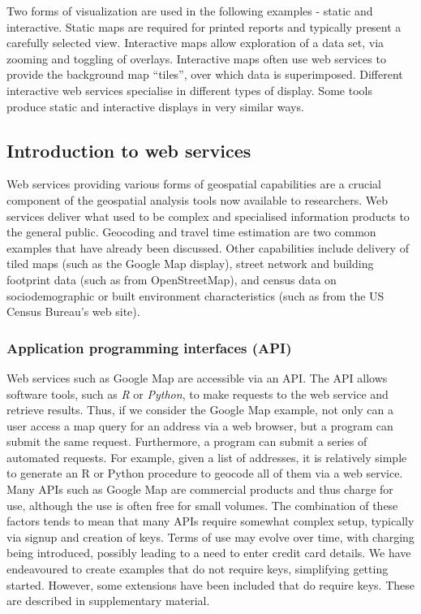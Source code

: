 \documentclass[utf8]{frontiersHLTH}
\begin{document}
Two forms of visualization are used in the following examples - static
and interactive. Static maps are required for printed reports and
typically present a carefully selected view. Interactive maps allow
exploration of a data set, via zooming and toggling of overlays.
Interactive maps often use web services to provide the background map
``tiles'', over which data is superimposed. Different interactive web
services specialise in different types of display. Some tools produce
static and interactive displays in very similar ways.

\hypertarget{introduction-to-web-services}{%
\subsection{Introduction to web
services}\label{introduction-to-web-services}}

Web services providing various forms of geospatial capabilities are a
crucial component of the geospatial analysis tools now available to
researchers. Web services deliver what used to be complex and
specialised information products to the general public. Geocoding and
travel time estimation are two common examples that have already been
discussed. Other capabilities include delivery of tiled maps (such as
the Google Map display), street network and building footprint data
(such as from OpenStreetMap), and census data on sociodemographic or
built environment characteristics (such as from the US Census Bureau's
web site).

\subsubsection{Application programming interfaces
(API)}\label{application-programming-interfaces-api}

Web services such as Google Map are accessible via an API. The API allows software tools,
such as {\em R} or {\em Python}, to make requests to the web service and retrieve
results. Thus, if we consider the Google Map example, not only can a
user access a map query for an address via a web browser, but a program
can submit the same request. Furthermore, a program can submit a series
of automated requests. For example, given a list of addresses, it is
relatively simple to generate an R or Python procedure to geocode all of
them via a web service. Many APIs such as Google Map are commercial products and thus charge
for use, although the use is often free for small volumes. The combination of these factors tends to mean that many APIs require
somewhat complex setup, typically via signup and creation of keys. Terms
of use may evolve over time, with charging being introduced, possibly
leading to a need to enter credit card details. We have endeavoured to create examples that do not require keys,
simplifying getting started. However, some extensions have been included
that do require keys. These are described in supplementary material.
\end{document}
